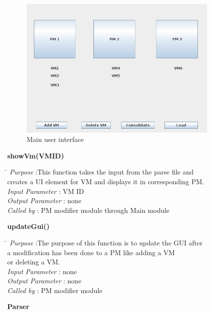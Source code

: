 \documentclass[a4paper,11pt]{article}
\begin{document}
\begin{figure}[h]
\centering
\includegraphics[height=7cm]{images/GUI.png}
\caption{Main user interface}
\label{fig:GUI}
\end{figure}
\textbf{showVm(VM\textunderscore ID)}  
\begin{tabbing}
\hspace*{4cm}\= \kill
 \textit{Purpose} \> :This function takes the input from the parse file and \\ \>creates a UI element for VM and displays it in corresponding PM.\\
  \textit{Input Parameter} \> : VM ID \\
  \textit{Output Parameter} \> : none \\
  \textit{Called by} \> : PM modifier module through Main module
  
\end{tabbing}
\textbf{updateGui()}  
\begin{tabbing}
\hspace*{4cm}\= \kill
 \textit{Purpose} \> :The purpose of this function is to update the GUI after\\ \> a modification has been done to a PM like adding a VM \\ \>or deleting a VM.\\
  \textit{Input Parameter} \> : none \\
  \textit{Output Parameter} \> : none \\
  \textit{Called by} \> : PM modifier module
  
\end{tabbing}
\pagebreak
\textbf{Parser}
\end{document}
